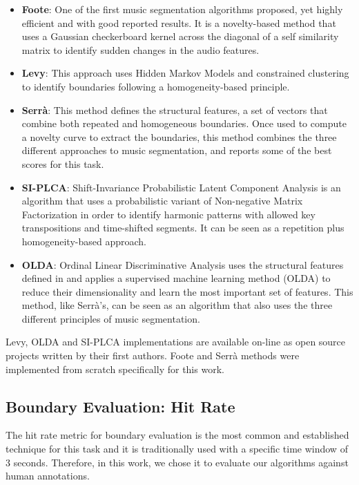 \documentclass{article}
\begin{document}
\begin{itemize}
  \item
    \textbf{Foote}: One of the first music segmentation algorithms proposed, yet highly efficient and with good reported results\cite{Foote1999}. It is a novelty-based method that uses a Gaussian checkerboard kernel across the diagonal of a self similarity matrix to identify sudden changes in the audio features.
  \item
    \textbf{Levy}: This approach uses Hidden Markov Models and constrained clustering to identify boundaries following a homogeneity-based principle\cite{Levy2008}.
  \item
    \textbf{Serr\`a}: This method defines the structural features, a set of vectors that combine both repeated and homogeneous boundaries. Once used to compute a novelty curve to extract the boundaries, this method combines the three different approaches to music segmentation, and reports some of the best scores for this task\cite{Serra2013}.
  \item
    \textbf{SI-PLCA}: Shift-Invariance Probabilistic Latent Component Analysis is an algorithm that uses a probabilistic variant of Non-negative Matrix Factorization in order to identify harmonic patterns with allowed key transpositions and time-shifted segments\cite{Weiss2011}. It can be seen as a repetition plus homogeneity-based approach.
  \item 
    \textbf{OLDA}: Ordinal Linear Discriminative Analysis uses the structural features defined in \cite{Serra2013} and applies a supervised machine learning method (OLDA) to reduce their dimensionality and learn the most important set of features\cite{McFee2014}. This method, like Serr\`a's, can be seen as an algorithm that also uses the three different principles of music segmentation.
\end{itemize}

Levy, OLDA and SI-PLCA implementations are available on-line as open source projects written by their first authors.
Foote and Serr\`a methods were implemented from scratch specifically for this work.

\subsection{Boundary Evaluation: Hit Rate}\label{subsec:hitrate}

The hit rate metric for boundary evaluation is the most common and established technique for this task and it is traditionally used with a specific time window of 3 seconds\cite{Ong2005}. 
Therefore, in this work, we chose it to evaluate our algorithms against human annotations.
\end{document}

